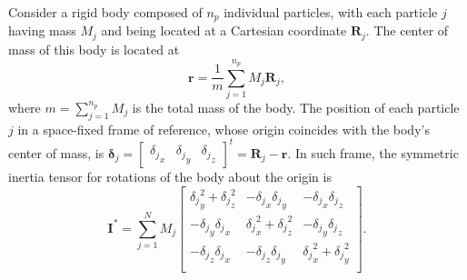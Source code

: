\documentclass[aip,jcp,reprint,amsmath,amssymb,amsfont]{revtex4-1}
\newcommand{\mt}[1]{\boldsymbol{\mathbf{#1}}}           %
\newcommand{\vt}[1]{\boldsymbol{\mathbf{#1}}}           %
\newcommand{\tr}[1]{#1^t}                               %
\begin{document}
Consider a rigid body composed of $n_p$ individual particles, with each particle $j$ having mass $M_j$ and being located at a Cartesian coordinate $\vt R_j$. The center of mass of this body is located at
\[
\vt r = \frac{1}{m}\sum_{j=1}^{n_p} M_j {\vt R}_j,
\]
where $m = \sum_{j=1}^{n_p} M_j$ is the total mass of the body. The position of each particle $j$ in a space-fixed frame of reference, whose origin coincides with the body's center of mass, is ${\vt \delta}_j = \tr{ [\begin{array}{ccc} {\delta_j}_x & {\delta_j}_y & {\delta_j}_z \end{array}]} = {\vt R}_j - {\vt r}$. In such frame, the symmetric inertia tensor for rotations of the body about the origin is\cite{Goldstein2002}
\[
{\mt I}^\ast = \sum_{j=1}^N M_j \left[ \begin{array}{ccc}
{\delta_j}_y^2 + {\delta_j}_z^2 & -{\delta_j}_x {\delta_j}_y & -{\delta_j}_x {\delta_j}_z \\
-{\delta_j}_y {\delta_j}_x & {\delta_j}_x^2 + {\delta_j}_z^2 & -{\delta_j}_y {\delta_j}_z \\
-{\delta_j}_z {\delta_j}_x & -{\delta_j}_z {\delta_j}_y & {\delta_j}_x^2 + {\delta_j}_y^2 \\
\end{array} \right].
\]
\end{document}
